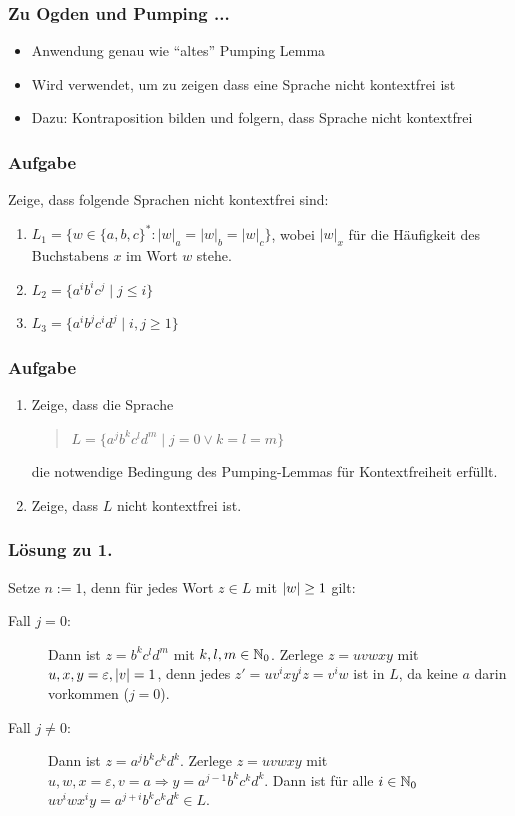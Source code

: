 \begin{frame}
\frametitle{Zu Ogden und Pumping ...}
\begin{itemize}
\item Anwendung genau wie "`altes"' Pumping Lemma
\item Wird verwendet, um zu zeigen dass eine Sprache nicht kontextfrei ist
\item Dazu: Kontraposition bilden und folgern, dass Sprache nicht kontextfrei
\end{itemize}
\end{frame}

\begin{frame}
\frametitle{Aufgabe}

Zeige, dass folgende Sprachen nicht kontextfrei sind:

\begin{enumerate}
  \item $L_1 = \{w \in \{a, b, c\}^*: |w|_a = |w|_b = |w|_c\}$,
	wobei $|w|_x$ für die Häufigkeit des
	Buchstabens $x$	im Wort $w$ stehe.
  \item $L_2 = \{a^ib^ic^j \mid j \leq i\}$
  \item $L_3=\{a^ib^jc^id^j \mid i,j \geq 1 \}$

\end{enumerate}
\end{frame}

\begin{frame}
\frametitle{Aufgabe}
\begin{enumerate}
  \item 
        Zeige, dass die Sprache
	\begin{quote}
	  $L = \{a^j b^k c^l d^m \mid j=0 \vee k=l=m\}$
	\end{quote}
	die notwendige Bedingung des Pumping-Lemmas für Kontextfreiheit
	erfüllt.
  \item Zeige, dass $L$ nicht kontextfrei ist.
\end{enumerate}
\end{frame}

\begin{frame}
\frametitle{Lösung zu 1.}

Setze $n := 1$, denn für jedes Wort $z \in L$ mit $\left\vert w \right\vert \geq 1$ gilt:

\begin{description}
	\item[Fall $j = 0$:] Dann ist $z = b^kc^ld^m$ mit $k, l, m \in \mathbb{N}_0$. Zerlege $z = uvwxy$ mit $u, x, y = \varepsilon, \left\vert v \right\vert = 1$, denn jedes $z'=uv^ixy^iz = v^iw$ ist in $L$, da keine $a$ darin vorkommen ($j=0$).
	\item[Fall $j \neq 0$:] Dann ist $z=a^jb^kc^kd^k$. Zerlege $z = uvwxy$ mit $u,w, x = \varepsilon, v = a \Rightarrow y = a^{j-1}b^kc^kd^k$. Dann ist für alle $i \in \mathbb{N}_0$ $uv^iwx^iy = a^{j+i}b^kc^kd^k \in L$.
\end{description}

\end{frame}

